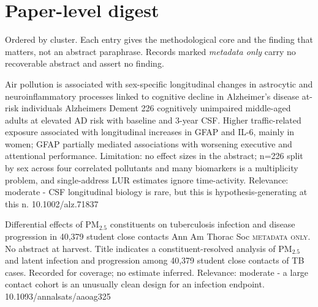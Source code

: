 \documentclass[10pt]{article}
\begin{document}
\vspace{4mm}

\par{}\baselineskip{}\baselineskip
\section*{\sffamily\bfseries\color{Deep}Paper-level digest}
\vspace{-1.5mm}{\color{Amber}\rule{\linewidth}{1.1pt}}\vspace{2.5mm}

{\fontsize{7.4}{9}\selectfont\color{Slate}Ordered by cluster. Each entry gives the
methodological core and the finding that matters, not an abstract paraphrase. Records
marked \textit{metadata only} carry no recoverable abstract and assert no finding.\par}


{Air pollution is associated with sex-specific longitudinal changes in astrocytic and neuroinflammatory processes linked to cognitive decline in Alzheimer's disease at-risk individuals}
{Alzheimers Dement}
{226 cognitively unimpaired middle-aged adults at elevated AD risk with baseline and 3-year CSF. Higher traffic-related exposure associated with longitudinal increases in GFAP and IL-6, mainly in women; GFAP partially mediated associations with worsening executive and attentional performance. Limitation: no effect sizes in the abstract; n=226 split by sex across four correlated pollutants and many biomarkers is a multiplicity problem, and single-address LUR estimates ignore time-activity. Relevance: moderate - CSF longitudinal biology is rare, but this is hypothesis-generating at this n.}
{10.1002/alz.71837}

\par{}\baselineskip{}\baselineskip
{}

{Differential effects of PM$_{2.5}$ constituents on tuberculosis infection and disease progression in 40,379 student close contacts}
{Ann Am Thorac Soc}
{\textsc{metadata only.} No abstract at harvest. Title indicates a constituent-resolved analysis of PM$_{2.5}$ and latent infection and progression among 40,379 student close contacts of TB cases. Recorded for coverage; no estimate inferred. Relevance: moderate - a large contact cohort is an unusually clean design for an infection endpoint.}
{10.1093/annalsats/aaoag325}
\end{document}
